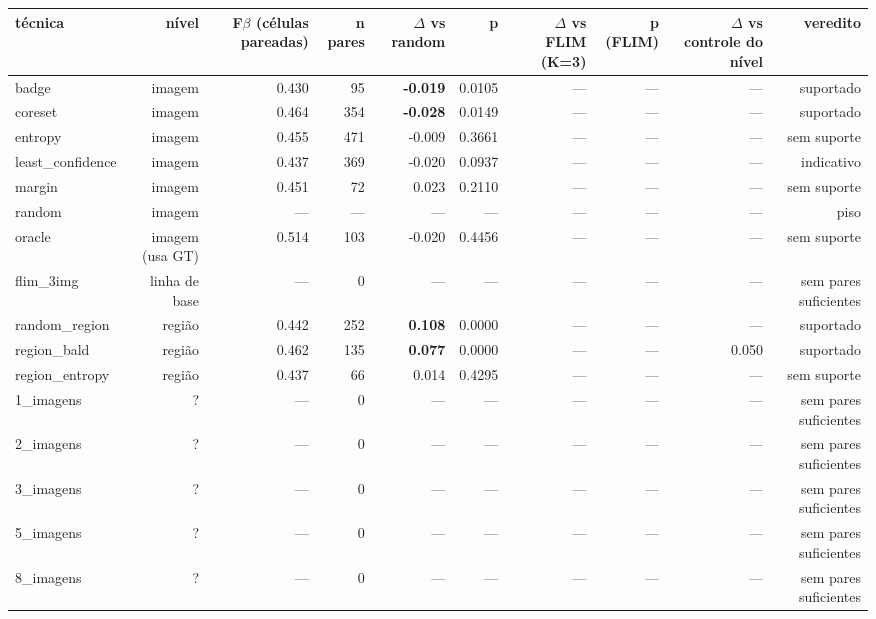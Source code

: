 \begin{adjustbox}{max width=\linewidth}
\begin{tabular}{lrrrrrrrrr}
\toprule
técnica & nível & F$\beta$ (células pareadas) & n pares & $\Delta$ vs random & p & $\Delta$ vs FLIM (K=3) & p (FLIM) & $\Delta$ vs controle do nível & veredito \\
\midrule
badge & imagem & 0.430 & 95 & \textbf{-0.019} & 0.0105 & --- & --- & --- & suportado \\
coreset & imagem & 0.464 & 354 & \textbf{-0.028} & 0.0149 & --- & --- & --- & suportado \\
entropy & imagem & 0.455 & 471 & -0.009 & 0.3661 & --- & --- & --- & sem suporte \\
least\_confidence & imagem & 0.437 & 369 & -0.020 & 0.0937 & --- & --- & --- & indicativo \\
margin & imagem & 0.451 & 72 & 0.023 & 0.2110 & --- & --- & --- & sem suporte \\
random & imagem & --- & --- & --- & --- & --- & --- & --- & piso \\
oracle & imagem (usa GT) & 0.514 & 103 & -0.020 & 0.4456 & --- & --- & --- & sem suporte \\
flim\_3img & linha de base & --- & 0 & --- & --- & --- & --- & --- & sem pares suficientes \\
random\_region & região & 0.442 & 252 & \textbf{0.108} & 0.0000 & --- & --- & --- & suportado \\
region\_bald & região & 0.462 & 135 & \textbf{0.077} & 0.0000 & --- & --- & 0.050 & suportado \\
region\_entropy & região & 0.437 & 66 & 0.014 & 0.4295 & --- & --- & --- & sem suporte \\
1\_imagens & ? & --- & 0 & --- & --- & --- & --- & --- & sem pares suficientes \\
2\_imagens & ? & --- & 0 & --- & --- & --- & --- & --- & sem pares suficientes \\
3\_imagens & ? & --- & 0 & --- & --- & --- & --- & --- & sem pares suficientes \\
5\_imagens & ? & --- & 0 & --- & --- & --- & --- & --- & sem pares suficientes \\
8\_imagens & ? & --- & 0 & --- & --- & --- & --- & --- & sem pares suficientes \\

\end{tabular}
\end{adjustbox}
